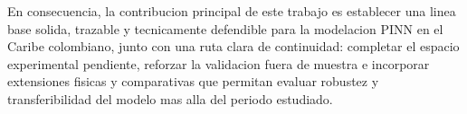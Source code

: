 En consecuencia, la contribucion principal de este trabajo es establecer una linea base solida, trazable y tecnicamente defendible para la modelacion PINN en el Caribe colombiano, junto con una ruta clara de continuidad: completar el espacio experimental pendiente, reforzar la validacion fuera de muestra e incorporar extensiones fisicas y comparativas que permitan evaluar robustez y transferibilidad del modelo mas alla del periodo estudiado.





